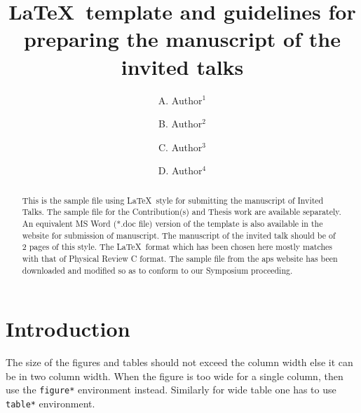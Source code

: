\documentclass[twocolumn,amsmath,amssymb]{snp}
\begin{document}
\title{{\Large \LaTeX\ template and guidelines for preparing the manuscript of the invited talks}}%

\author{\large A. Author$^1$}
\author{\large B. Author$^2$}
\author{\large C. Author$^3$}
\author{\large D. Author$^4$}%




\begin{abstract}
This is the sample file using \LaTeX\ style for submitting the manuscript of Invited Talks. The sample file for the  
Contribution(s) and Thesis work are available separately. An equivalent MS Word (*.doc file) version of the 
template is also available in  the website for submission of manuscript. The manuscript of the invited 
talk should be of 2 pages of this style. The \LaTeX\ format which has been 
chosen here mostly matches with that of Physical Review C format. The sample file from the aps website has 
been downloaded and modified so as to conform to our Symposium proceeding.
\end{abstract}\maketitle


\section{Introduction}





The size of the figures and tables should not exceed the column width else it can be in two column width. When the figure is too wide for a single column, then use the \texttt{figure*} environment instead. Similarly for wide table one has to use 
\texttt{table*} environment.
\end{document}
